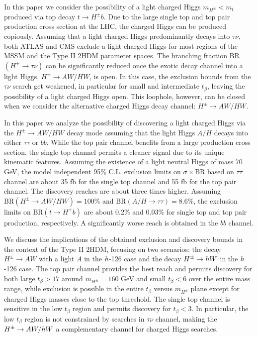 In this paper we consider the possibility of a light charged Higgs $m_{H^{\pm}} < m_t$ produced via top decay $t \rightarrow H^{\pm} b$. Due to the large single top and top pair production cross section at the LHC, the charged Higgs can be produced copiously. Assuming that a light charged Higgs predominantly decays into $\tau\nu$, both ATLAS and CMS exclude a light charged Higgs for most regions of the MSSM and the Type II $2$HDM parameter spaces. The branching fraction BR$(H^{\pm} \rightarrow \tau\nu)$ can be significantly reduced once the exotic decay channel into a light Higgs, $H^{\pm} \rightarrow AW/HW$, is open. In this case, the exclusion bounds from the $\tau\nu$ search get weakened, in particular for small and intermediate $t_{\beta}$, leaving the possibility of a light charged Higgs open. This loophole, however, can be closed when we consider the alternative charged Higgs decay channel: $H^\pm \to AW/HW$.

In this paper we analyze the possibility of discovering a light charged Higgs via the $H^{\pm} \rightarrow AW/HW$ decay mode assuming that the light Higgs $A/H$ decays into either $\tau\tau$ or $bb$. While the top pair channel benefits from a large production cross section, the single top channel permits a cleaner signal due to its unique kinematic features. Assuming the existence of a light neutral Higgs of mass 70 GeV, the model independent 95\% C.L. exclusion limits on $\sigma\times$BR based on $\tau\tau$ channel are about 35 fb for the single top channel and 55 fb for the top pair channel. The discovery reaches are about three times higher. Assuming $\text{BR}(H^{\pm} \rightarrow AW/HW)=100\%$ and $\text{BR}(A/H \rightarrow \tau\tau)=8.6\%$, the exclusion limits on $\text{BR}(t \rightarrow H^+ b)$ are about 0.2\% and 0.03\% for single top and top pair production, respectively. A significantly worse reach is obtained in the $bb$ channel. 

We discuss the implications of the obtained exclusion and discovery bounds in the context of the Type II $2$HDM, focusing on two scenarios: the decay $H^{\pm} \rightarrow AW$ with a light $A$ in the $h$-126 case and the decay $H^{\pm} \rightarrow h W$ in the $h$-126 case.  The top pair channel provides the best reach and permits discovery for both large $t_{\beta}>17$ around $m_{H^{\pm}}=160$ GeV and small $t_{\beta}<6$ over the entire mass range, while exclusion is possible in the entire $t_{\beta}$ versus $m_{H^{\pm}}$ plane except for charged Higgs masses close to the top threshold. The single top channel is sensitive in the low $t_{\beta}$ region and permits discovery for $t_{\beta}< 3$. In particular, the low $t_{\beta}$ region is not constrained by searches in $\tau\nu$ channel, making the $H^{\pm} \rightarrow AW/h W$ a complementary channel for charged Higgs searches.

